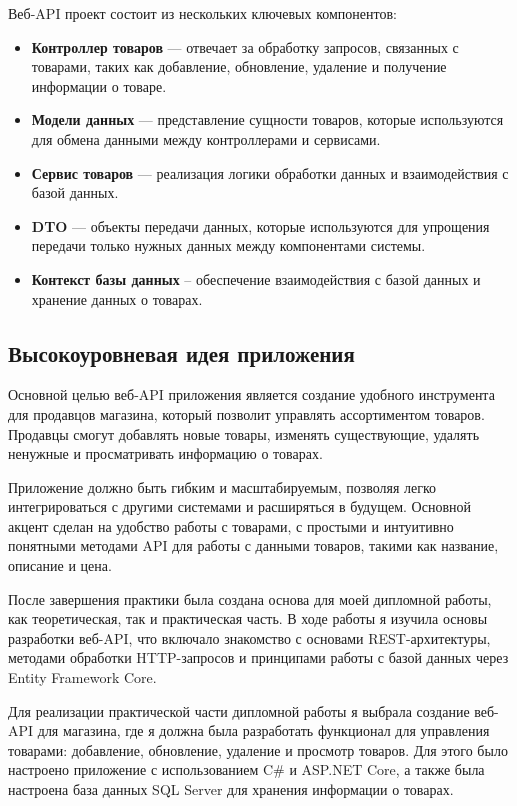 \documentclass[a4paper,12pt]{report}
\begin{document}
Веб-\ac{API} проект состоит из нескольких ключевых компонентов:
\begin{itemize}
  \item
  \textbf{Контроллер товаров} --- отвечает за обработку запросов, связанных с товарами, таких как добавление, обновление, удаление и получение информации о товаре.
  \item 
  \textbf{Модели данных} --- представление сущности товаров, которые используются для обмена данными между контроллерами и сервисами.
  \item
  \textbf{Сервис товаров} --- реализация логики обработки данных и взаимодействия с базой данных.
  \item
  \textbf{\ac{DTO}} --- объекты передачи данных, которые используются для упрощения передачи только нужных данных между компонентами системы.
  \item
  \textbf{Контекст базы данных} -- обеспечение взаимодействия с базой данных и хранение данных о товарах.
\end{itemize}

\subsection{Высокоуровневая идея приложения}

Основной целью веб-\ac{API} приложения является создание удобного инструмента для продавцов магазина, 
который позволит управлять ассортиментом товаров. Продавцы смогут добавлять новые товары, 
изменять существующие, удалять ненужные и просматривать информацию о товарах.

Приложение должно быть гибким и масштабируемым, позволяя легко интегрироваться с другими системами и расширяться в будущем. 
Основной акцент сделан на удобство работы с товарами, с простыми и интуитивно понятными методами \ac{API} для работы с данными товаров, 
такими как название, описание и цена.


После завершения практики была создана основа для моей дипломной работы, как теоретическая, так и практическая часть. 
В ходе работы я изучила основы разработки веб-\ac{API}, что включало знакомство с основами \ac{REST}-архитектуры, методами обработки 
\ac{HTTP}-запросов и принципами работы с базой данных через Entity Framework Core.

Для реализации практической части дипломной работы я выбрала создание веб-\ac{API} для магазина, где я должна была разработать 
функционал для управления товарами: добавление, обновление, удаление и просмотр товаров. Для этого было настроено приложение 
с использованием C\# и ASP.NET Core, а также была настроена база данных \ac{SQL} Server для хранения информации о товарах.
\end{document}
